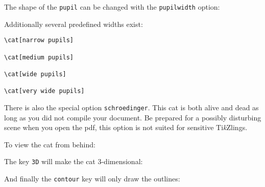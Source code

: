 \documentclass[parskip=half]{scrartcl}
\newcommand{\tikzlings}{Ti\emph{k}Zlings\xspace}
\newcommand{\cathookbackground}{\path (-1.6,0.1) rectangle (0.905, 2.17);}
\begin{document}
The shape of the \lstinline|pupil| can be changed with the \lstinline|pupilwidth| option:
\begin{tcblisting}{}
\cat[pupilwidth=0.015]
\end{tcblisting}

Additionally several predefined widths exist:
\begin{tcolorbox}
\begin{lstlisting}[morekeywords={narrow,medium,wide,very,pupils}]
\cat[narrow pupils]

\cat[medium pupils]

\cat[wide pupils]

\cat[very wide pupils]
\end{lstlisting} 

\tcblower
{}
\end{tcolorbox}

There is also the special option \lstinline|schroedinger|. This cat is both alive and dead as long as you did not compile your document.
Be prepared for a possibly disturbing scene when you open the pdf, this option is not suited for sensitive \tikzlings.
\begingroup
\makeatletter
\renewcommand*{\cat}[1][]{%
    \tikzset{/cat/.cd,#1}%
    \cat@tombstone%
}
\renewcommand{\cathookbackground}{}
\makeatother
\begin{tcblisting}{}
\cat[schroedinger]
\end{tcblisting}
\endgroup

To view the cat from behind:
\begin{tcblisting}{}
\cat[back]
\end{tcblisting}

The key \lstinline|3D| will make the cat 3-dimensional:
\begin{tcblisting}{}
\cat[3D]
\end{tcblisting}

And finally the \lstinline|contour| key will only draw the outlines:
\begin{tcblisting}{}
\cat[contour=black]
\end{tcblisting}

%
%
\clearpage
\end{document}
